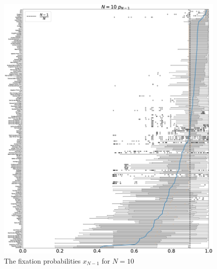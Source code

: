 \documentclass[10pt,letterpaper]{article}
\begin{document}
\begin{figure}[!hbtp]
    \centering
    \includegraphics[draft, width=\textwidth]{./Fig32.eps}
    \caption{The fixation probabilities \(x_{N-1}\) for \(N=10\)}
\end{figure}
\end{document}
